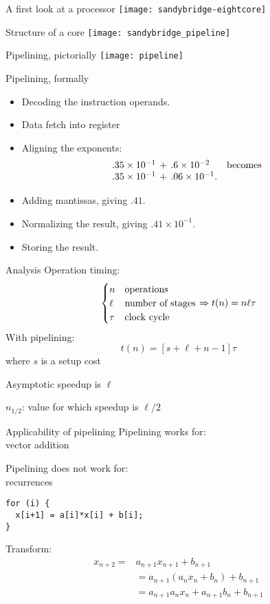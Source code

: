 \begin{frame}{A first look at a processor}
  \texttt{[image: sandybridge-eightcore]}
\end{frame}

\begin{frame}{Structure of a core}
  \texttt{[image: sandybridge\_pipeline]}
\end{frame}

\begin{frame}{Pipelining, pictorially}
    \texttt{[image: pipeline]}
\end{frame}

\begin{frame}{Pipelining, formally}
  \begin{itemize}
\item Decoding the instruction  operands.
\item Data fetch into register
\item Aligning the exponents:
\[ 
\begin{array}{ll}
.35\times 10^{-1}\,+\, .6\times 10^{-2}&\hbox{becomes}\\
.35\times 10^{-1}\,+\, .06\times 10^{-1}.
\end{array}
\]
\item Adding mantissas, giving  $.41$.
\item Normalizing the result, giving $.41\times 10^{-1}$.
\item Storing the result.
\end{itemize}
\end{frame}

\begin{frame}{Analysis}
Operation timing:
\[ 
\begin{cases}
  n&\hbox{operations}\\ \ell&\hbox{number of stages}\\ \tau&\hbox{clock cycle}
\end{cases} \Rightarrow
t(n)=n\ell\tau
\]
With pipelining:
\[ t(n)=[s+\ell+n-1]\tau \]
where $s$ is a setup cost

Asymptotic speedup is $\ell$

$n_{1/2}$: value for which speedup is $\ell/2$
\end{frame}

\begin{frame}[fragile]{Applicability of pipelining}
  Pipelining works for:\\
  vector addition

Pipelining does not work for:\\
recurrences
\begin{verbatim}
for (i) {
  x[i+1] = a[i]*x[i] + b[i];
}
\end{verbatim}
Transform:
\[
\begin{array}{rl}
  x_{n+2}=&a_{n+1}x_{n+1}+b_{n+1}\\
    &=a_{n+1}(a_nx_n+b_n)+b_{n+1}\\
    &=a_{n+1}a_nx_n + a_{n+1}b_n+b_{n+1}
\end{array}
\]
\end{frame}

